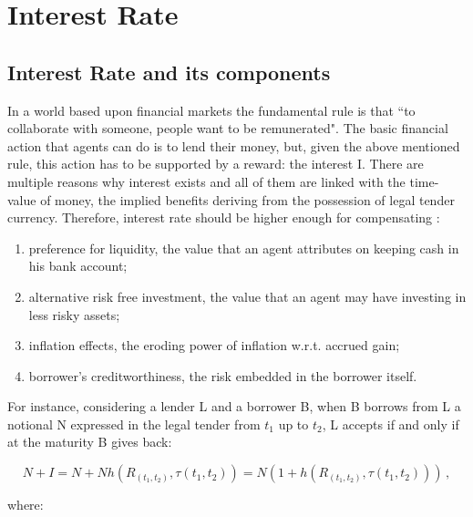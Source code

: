 \chapter{Interest Rate}
\label{chap:int_rate}


\section{Interest Rate and its components}

In a world based upon financial markets the fundamental rule is that ``to collaborate with someone, people want to be remunerated".
The basic financial action that agents can do is to lend their money, but, given the above mentioned rule, this action has to be supported by a reward: the interest I.
There are multiple reasons why interest exists and all of them are linked with the time-value of money, the implied benefits deriving from the possession of legal tender currency. Therefore, interest rate should be higher enough for compensating :

\begin{enumerate}
\item preference for liquidity, the value that an agent attributes on keeping cash in his bank account;
\item alternative risk free investment, the value that an agent may have investing in less risky assets;
\item inflation effects, the eroding power of inflation w.r.t. accrued gain;
\item borrower's creditworthiness, the risk embedded in the borrower itself.
\end{enumerate}

For instance, considering a lender L and a borrower B, when B borrows from L a notional N expressed in the legal tender from $t_{1}$ up to $t_{2}$, L accepts if and only if at the maturity B gives back:

\begin{equation}
    N+I=N+N h(R_{(t_{1},t_{2})},\tau(t_{1},t_{2})) =N (1+  h(R_{(t_{1},t_{2})},\tau(t_{1},t_{2})))\,,
\end{equation}

where:


